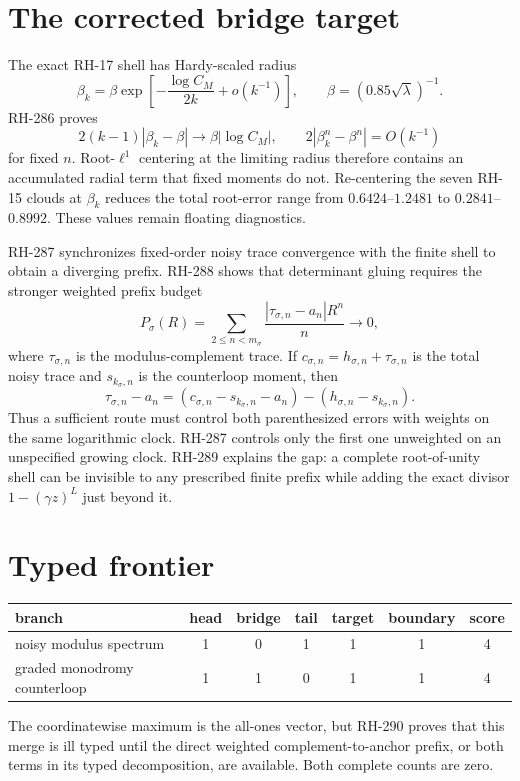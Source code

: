 \documentclass[11pt]{article}
\theoremstyle{remark}\newtheorem{remark}[proposition]{Remark}
\begin{document}
\section{The corrected bridge target}
The exact RH-17 shell has Hardy-scaled radius
\[
 \beta_k=\beta\exp\left[-\frac{\log C_M}{2k}+o(k^{-1})\right],
 \qquad \beta=(0.85\sqrt\lambda)^{-1}.
\]
RH-286 proves
\[
 2(k-1)|\beta_k-\beta|\to\beta|\log C_M|,
 \qquad
 2|\beta_k^n-\beta^n|=O(k^{-1})
\]
for fixed $n$.  Root-$\ell^1$ centering at the limiting radius therefore
contains an accumulated radial term that fixed moments do not.  Re-centering
the seven RH-15 clouds at $\beta_k$ reduces the total root-error range from
$0.6424$--$1.2481$ to $0.2841$--$0.8992$.  These values remain floating
diagnostics.

RH-287 synchronizes fixed-order noisy trace convergence with the finite shell
to obtain a diverging prefix.  RH-288 shows that determinant gluing requires
the stronger weighted prefix budget
\[
 P_\sigma(R)=\sum_{2\le n<m_\sigma}
 \frac{|\tau_{\sigma,n}-a_n|R^n}{n}\longrightarrow0,
\]
where $\tau_{\sigma,n}$ is the modulus-complement trace.  If
$c_{\sigma,n}=h_{\sigma,n}+\tau_{\sigma,n}$ is the total noisy trace and
$s_{k_\sigma,n}$ is the counterloop moment, then
\[
 \tau_{\sigma,n}-a_n
 =(c_{\sigma,n}-s_{k_\sigma,n}-a_n)
  -(h_{\sigma,n}-s_{k_\sigma,n}).
\]
Thus a sufficient route must control both parenthesized errors with weights
on the same logarithmic clock.  RH-287 controls only the first one unweighted
on an unspecified growing clock.  RH-289 explains the gap: a complete
root-of-unity shell can be invisible to any prescribed finite prefix while
adding the exact divisor $1-(\gamma z)^L$ just beyond it.

\section{Typed frontier}
\begin{center}\small
\begin{tabular}{lccccc|c}\toprule
branch & head & bridge & tail & target & boundary & score\\\midrule
noisy modulus spectrum & 1&0&1&1&1&4\\
graded monodromy counterloop & 1&1&0&1&1&4\\\bottomrule
\end{tabular}
\end{center}
The coordinatewise maximum is the all-ones vector, but RH-290 proves that
this merge is ill typed until the direct weighted complement-to-anchor
prefix, or both terms in its typed decomposition, are available.  Both
complete counts are zero.
\end{document}
